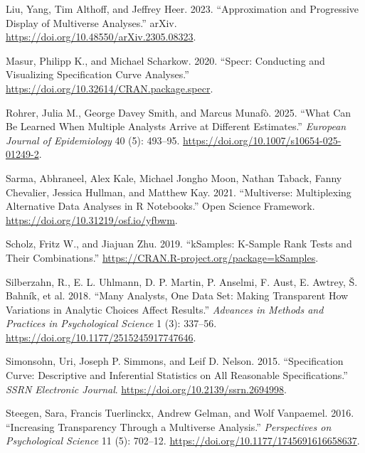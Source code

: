 \documentclass[
  letterpaper,
  DIV=11,
  numbers=noendperiod]{scrartcl}
\newlength{\cslhangindent}
\newenvironment{CSLReferences}[2] %
 {\begin{list}{}{%
  \setlength{\itemindent}{0pt}
  \setlength{\leftmargin}{0pt}
  \setlength{\parsep}{0pt}
  \ifodd #1
   \setlength{\leftmargin}{\cslhangindent}
   \setlength{\itemindent}{-1\cslhangindent}
  \fi
  \setlength{\itemsep}{#2\baselineskip}}}
 {\end{list}}
\begin{document}
\begin{CSLReferences}{1}{0}
Liu, Yang, Tim Althoff, and Jeffrey Heer. 2023. {``Approximation and
{Progressive} {Display} of {Multiverse} {Analyses}.''} arXiv.
\url{https://doi.org/10.48550/arXiv.2305.08323}.

Masur, Philipp K., and Michael Scharkow. 2020. {``Specr: {Conducting}
and {Visualizing} {Specification} {Curve} {Analyses}.''}
\url{https://doi.org/10.32614/CRAN.package.specr}.

Rohrer, Julia M., George Davey Smith, and Marcus Munafò. 2025. {``What
Can Be Learned When Multiple Analysts Arrive at Different Estimates.''}
\emph{European Journal of Epidemiology} 40 (5): 493--95.
\url{https://doi.org/10.1007/s10654-025-01249-2}.

Sarma, Abhraneel, Alex Kale, Michael Jongho Moon, Nathan Taback, Fanny
Chevalier, Jessica Hullman, and Matthew Kay. 2021. {``Multiverse:
{Multiplexing} {Alternative} {Data} {Analyses} in {R} {Notebooks}.''}
Open Science Framework. \url{https://doi.org/10.31219/osf.io/yfbwm}.

Scholz, Fritz W., and Jiajuan Zhu. 2019. {``{kSamples}: {K}-{Sample}
{Rank} {Tests} and {Their} {Combinations}.''}
\url{https://CRAN.R-project.org/package=kSamples}.

Silberzahn, R., E. L. Uhlmann, D. P. Martin, P. Anselmi, F. Aust, E.
Awtrey, Š. Bahník, et al. 2018. {``Many {Analysts}, {One} {Data} {Set}:
{Making} {Transparent} {How} {Variations} in {Analytic} {Choices}
{Affect} {Results}.''} \emph{Advances in Methods and Practices in
Psychological Science} 1 (3): 337--56.
\url{https://doi.org/10.1177/2515245917747646}.

Simonsohn, Uri, Joseph P. Simmons, and Leif D. Nelson. 2015.
{``Specification {Curve}: {Descriptive} and {Inferential} {Statistics}
on {All} {Reasonable} {Specifications}.''} \emph{SSRN Electronic
Journal}. \url{https://doi.org/10.2139/ssrn.2694998}.

Steegen, Sara, Francis Tuerlinckx, Andrew Gelman, and Wolf Vanpaemel.
2016. {``Increasing {Transparency} {Through} a {Multiverse}
{Analysis}.''} \emph{Perspectives on Psychological Science} 11 (5):
702--12. \url{https://doi.org/10.1177/1745691616658637}.


\end{CSLReferences}
\end{document}
